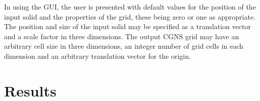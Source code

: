 \documentclass[a4paper,10pt]{article}
\begin{document}
In using the GUI, the user is presented with default values for the position of
the input solid and the properties of the grid, these being zero or one as
appropriate. The position and size of the input solid may be specified as a
translation vector and a scale factor in three dimensions. The output CGNS grid
may have an arbitrary cell size in three dimensions, an integer number of grid
cells in each dimension and an arbitrary translation vector for the origin.

\section{Results}
\end{document}
